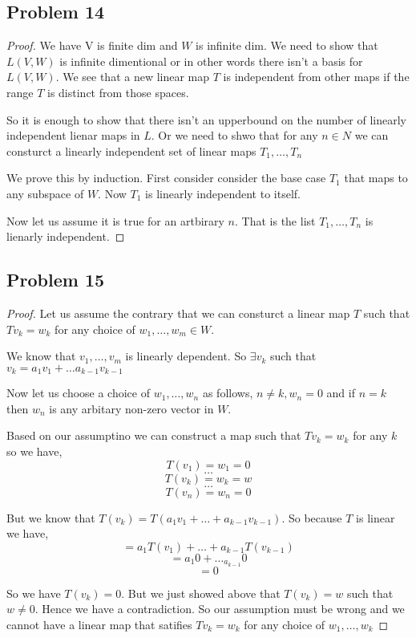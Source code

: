 \documentclass[a4paper]{report}
\begin{document}
\subsection*{Problem 14}
\begin{proof}
    We have V is finite dim and  $W$ is infinite dim. We need to show that $L(V,W)$ is infinite dimentional or in other words there isn't a basis for $L(V,W)$. We see that a new linear map  $T$ is independent from other maps if the range  $T$ is distinct from those spaces.




    So it is enough to show that there isn't an upperbound on the number of linearly independent lienar maps in $L$. Or we need to shwo that for any  $n \in N$ we can consturct a linearly independent set of linear maps $T_1,\dots,T_n$

    We prove this by induction. First consider consider the base case $T_1$ that maps to any subspace of $W$. Now $T_1$ is linearly independent to itself.

    Now let us assume it is true for an artbirary $n$. That is the list  $T_1,\dots,T_n$ is lienarly independent.

\end{proof}

\subsection*{Problem 15}
\begin{proof}
Let us assume the contrary that we can consturct a linear map $T$ such that $Tv_k = w_k$ for any choice of $w_1,\dots,w_m \in W$. 

We know that $v_1,\dots,v_m$ is linearly dependent. So  $\exists v_k$ such that $v_k = a_1v_1 + \dots a_{k-1}v_{k-1}$

Now let us choose a choice of $w_1,\dots,w_n$ as follows, $n \ne k, w_n = 0$ and if $n = k$ then $w_n$ is any arbitary non-zero vector in $W$.

Based on our assumptino we can construct a map such that $Tv_k = w_k$ for any $k$ so we have,  
$$ T(v_1) = w_1 = 0 $$ 
$$ \dots $$ 
$$ T(v_k) = w_k  = w$$ 
$$ \dots $$ 
$$ T(v_n) = w_n = 0 $$ 

But we know that $T(v_k) = T(a_1v_1 + \dots + a_{k-1}v_{k-1})$. So because $T$ is linear we have, 
$$ = a_1T(v_1) + \dots + a_{k-1}T(v_{k-1}) $$ 
$$ = a_1 0+ \dots  _ a_{k-1} 0$$ 
$$ = 0 $$ 

So we have $T(v_k) = 0$. But we just showed above that  $T(v_k) = w$ such that $w \ne 0$. Hence we have a contradiction. So our assumption must be wrong and we cannot have a linear map that satifies  $Tv_k = w_k$ for any choice of $w_1,\dots,w_k$

\end{proof}
\end{document}
